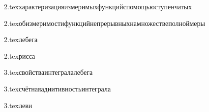 {2.tex}{характеризацияизмеримыхфункцийспомощьюступенчатых}

{2.tex}{обизмеримостифункцийнепрерывныхнамножествеполноймеры}

{2.tex}{лебега}

{2.tex}{рисса}

{3.tex}{свойстваинтегралалебега}

{3.tex}{счётнаяадиитивностьинтеграла}

{3.tex}{леви}

















